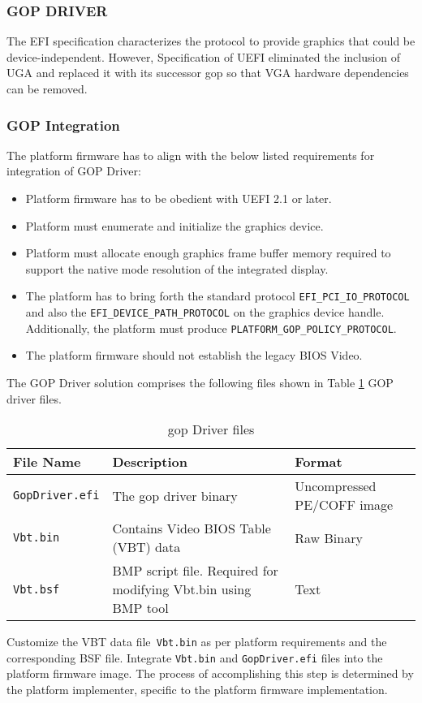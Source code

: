 \subsubsection{GOP DRIVER}
The EFI specification characterizes the  protocol to provide graphics that could be device-independent. However, Specification of UEFI eliminated the inclusion of UGA and replaced it with its successor \gls{gop} so that VGA hardware dependencies can be removed.

\subsubsection{GOP Integration}
The platform firmware has to align with the below listed requirements for integration of GOP Driver:
\begin{itemize}
	\item Platform firmware has to be obedient with UEFI 2.1 or later.
	\item Platform must enumerate and initialize the graphics device.
	\item Platform must allocate enough graphics frame buffer memory required to support the native mode resolution of the integrated display.
	\item The platform has to bring forth the standard protocol \verb|EFI_PCI_IO_PROTOCOL| and also the \verb|EFI_DEVICE_PATH_PROTOCOL| on the graphics device handle. Additionally, the platform must produce \verb|PLATFORM_GOP_POLICY_PROTOCOL|.
	\item The platform firmware should not establish the legacy BIOS Video.
\end{itemize}

The GOP Driver solution comprises the following files shown in Table \ref{table:gop-driver-files} GOP driver files.

\begin{table}
	\centering
	\renewcommand\arraystretch{2}
	\caption{\gls{gop} Driver files}\label{table:gop-driver-files}
	\begin{tabular}{l | p{5cm} | p{5cm}}
		File Name & Description & Format
		\\ \hline \hline
		\verb|GopDriver.efi| & The \gls{gop} driver binary & Uncompressed PE/COFF image
		\\ \hline
		\verb|Vbt.bin| & Contains Video BIOS Table (VBT) data & Raw Binary
		\\ \hline
		\verb|Vbt.bsf| & BMP script file. Required for modifying Vbt.bin using BMP tool & Text
		\\ \hline
	\end{tabular}
\end{table}

Customize the VBT data file\verb| Vbt.bin| as per platform requirements and the corresponding BSF file. Integrate \verb|Vbt.bin| and \verb|GopDriver.efi| files into the platform firmware image. The process of accomplishing this step is determined by the platform implementer, specific to the platform firmware implementation.
